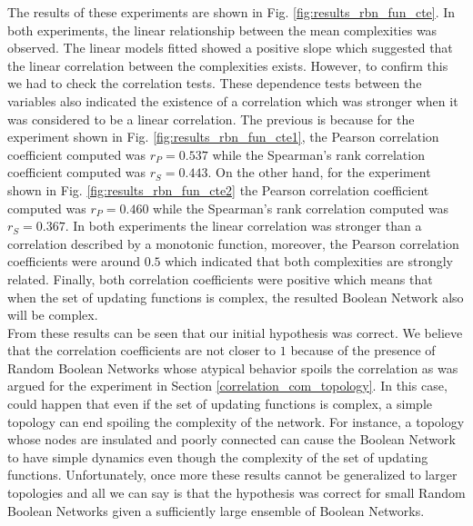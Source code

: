 The results of these experiments are shown in Fig. \ref{fig:results_rbn_fun_cte}. In both experiments, the linear relationship between the mean complexities was observed. The linear models fitted showed a positive slope which suggested that the linear correlation between the complexities exists. However, to confirm this we had to check the correlation tests. These dependence tests between the variables also indicated the existence of a correlation which was stronger when it was considered to be a linear correlation. The previous is because for the experiment shown in Fig. \ref{fig:results_rbn_fun_cte1}, the Pearson correlation coefficient computed was $r_{P} =0.537$ while the Spearman's rank correlation coefficient computed was $r_{S} =0.443$. On the other hand, for the experiment shown in Fig. \ref{fig:results_rbn_fun_cte2} the Pearson correlation coefficient computed was $r_{P} =0.460$ while the Spearman's rank correlation computed was $r_{S} =0.367$. In both experiments the linear correlation was stronger than a correlation described by a monotonic function, moreover, the Pearson correlation coefficients were around $0.5$ which indicated that both complexities are strongly related. Finally, both correlation coefficients were positive which means that when the set of updating functions is complex, the resulted Boolean Network also will be complex.\\


From these results can be seen that our initial hypothesis was correct. We believe that the correlation coefficients are not closer to $1$ because of the presence of Random Boolean Networks whose atypical behavior spoils the correlation as was argued for the experiment in Section \ref{correlation_com_topology}. In this case, could happen that even if the set of updating functions is complex, a simple topology can end spoiling the complexity of the network. For instance, a topology whose nodes are insulated and poorly connected can cause the Boolean Network to have simple dynamics even though the complexity of the set of updating functions. Unfortunately, once more these results cannot be generalized to larger topologies and all we can say is that the hypothesis was correct for small Random Boolean Networks given a sufficiently large ensemble of Boolean Networks.\\

